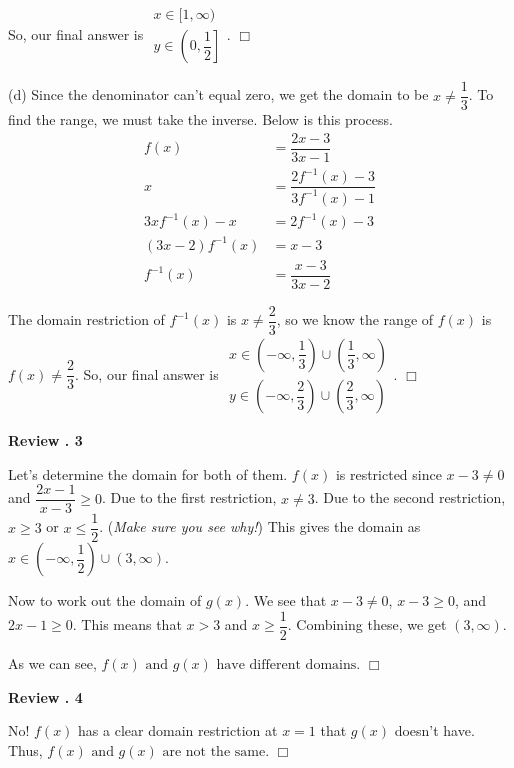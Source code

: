 \documentclass[lang=en,11pt]{elegantbook}
\begin{document}
So, our final answer is $\boxed{\begin{matrix} x\in[1,\infty) \\ y\in\left(0,\dfrac{1}{2}\right] \end{matrix}}$. $\Box$

(d) Since the denominator can't equal zero, we get the domain to be $x\neq \dfrac{1}{3}$.  To find the range, we must take the inverse.  Below is this process.\begin{align*}
    f(x)&=\dfrac{2x-3}{3x-1} \\
    x&=\dfrac{2f^{-1}(x)-3}{3f^{-1}(x)-1} \\
    3xf^{-1}(x)-x &= 2f^{-1}(x)-3 \\
    (3x-2)f^{-1}(x)&=x-3 \\
    f^{-1}(x)&=\dfrac{x-3}{3x-2}
\end{align*}

The domain restriction of $f^{-1}(x)$ is $x\neq \dfrac{2}{3}$, so we know the range of $f(x)$ is $f(x)\neq \dfrac{2}{3}$.  So, our final answer is $\boxed{\begin{matrix} x\in\left(-\infty,\dfrac{1}{3}\right)\cup\left(\dfrac{1}{3},\infty\right) \\ y\in\left(-\infty,\dfrac{2}{3}\right)\cup\left(\dfrac{2}{3},\infty\right) \end{matrix}}$. $\Box$\vspace{3mm}

\noindent \textbf{Review . 3}

Let's determine the domain for both of them.  $f(x)$ is restricted since $x-3 \neq 0$ and $\dfrac{2x-1}{x-3} \geq 0$.  Due to the first restriction, $x\neq 3$.  Due to the second restriction, $x \geq 3$ or $x\leq \dfrac{1}{2}$.  (\textit{Make sure you see why!})  This gives the domain as $x\in\left(-\infty,\dfrac{1}{2}\right)\cup\left(3,\infty\right)$.

Now to work out the domain of $g(x)$.  We see that $x-3\neq 0$, $x-3 \geq 0$, and $2x-1\geq 0$.  This means that $x>3$ and $x\geq \dfrac{1}{2}$. Combining these, we get $(3,\infty)$. 

As we can see, $\boxed{f(x) \text{ and } g(x) \text{ have different domains}}$. $\Box$\vspace{3mm}

\noindent \textbf{Review . 4}

No!  $f(x)$ has a clear domain restriction at $x=1$ that $g(x)$ doesn't have.  Thus, $\boxed{f(x) \text{ and } g(x) \text{ are not the same}}$. $\Box$\vspace{3mm}
\end{document}
